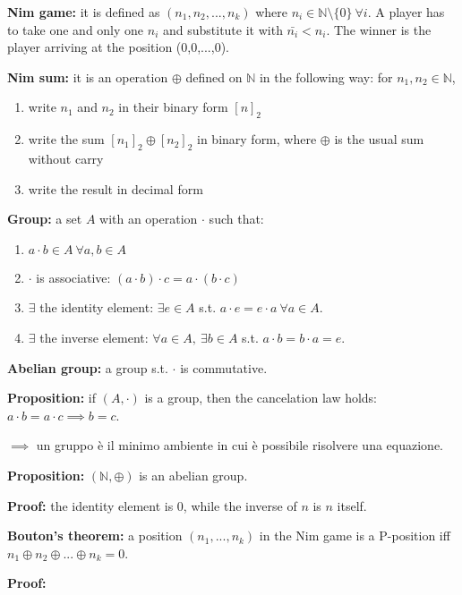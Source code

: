 \bigskip
\noindent \textbf{Nim game:} it is defined as $(n_1,n_2,...,n_k)$ where 
$n_i \in \mathbb{N}\setminus\{0\} ~\forall i$. A player has to take one and only 
one $n_i$ and substitute it with $\bar{n_i} < n_i$. The winner is the player 
arriving at the position (0,0,...,0).

\noindent \textbf{Nim sum:} it is an operation $\oplus$ defined on $\mathbb{N}$ 
in the following way: for $n_1,n_2 \in \mathbb{N}$,
\begin{enumerate}
	\item write $n_1$ and $n_2$ in their binary form $[n]_2$
	\item write the sum $[n_1]_2 \oplus [n_2]_2$ in binary form, where $\oplus$ 
	is the usual sum without carry
	\item write the result in decimal form
\end{enumerate}

\noindent \textbf{Group:} a set $A$ with an operation $\cdot$ such that:
\begin{enumerate}
	\item $a \cdot b \in A ~\forall a,b \in A$
	\item $\cdot$ is associative: $(a \cdot b) \cdot c = a \cdot (b \cdot c)$
	\item $\exists$ the identity element: $\exists e \in A$ s.t. 
	$a \cdot e = e \cdot a ~\forall a \in A$.
	\item $\exists$ the inverse element: $\forall a \in A, ~\exists b \in A$ 
	s.t. $a \cdot b = b \cdot a = e$.
\end{enumerate}
\textbf{Abelian group:} a group s.t. $\cdot$ is commutative.

\noindent \textbf{Proposition:} if $(A,\cdot)$ is a group, then the cancelation 
law holds: $a \cdot b = a \cdot c \implies b = c$.

\noindent $\implies$ un gruppo è il minimo ambiente in cui è possibile risolvere 
una equazione.

\noindent \textbf{Proposition:} $(\mathbb{N},\oplus)$ is an abelian group.

\noindent \textbf{Proof:} the identity element is 0, while the inverse of $n$ 
is $n$ itself.

\bigskip
\noindent \textbf{Bouton's theorem:} a position $(n_1,...,n_k)$ in the Nim game 
is a P-position iff $n_1 \oplus n_2 \oplus ... \oplus n_k = 0$.

\noindent \textbf{Proof:}

